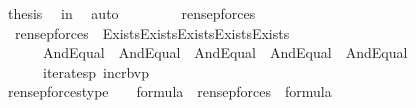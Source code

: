 \begin{isabellebody}
\ {\isacharquery}{\kern0pt}thesis\ \isamarkupfalse%
\ in{\isasymF}\ \isamarkupfalse%
\ auto\isanewline
\ \ \ \ \isamarkupfalse%
\isanewline
\ \ \isamarkupfalse%
\isanewline
{}\isamarkupfalse%
%
\endisatagproof
{\isafoldproof}%
%
\isadelimproof
\isanewline
%
\endisadelimproof
\isanewline
{}\isamarkupfalse%
\ ren{\isacharunderscore}{\kern0pt}sep{\isacharunderscore}{\kern0pt}forces\ \isanewline
\ \ {\isachardoublequoteopen}ren{\isacharunderscore}{\kern0pt}sep{\isacharunderscore}{\kern0pt}forces{\isacharparenleft}{\kern0pt}{\isasymphi}{\isacharparenright}{\kern0pt}\ {\isasymequiv}\ Exists{\isacharparenleft}{\kern0pt}Exists{\isacharparenleft}{\kern0pt}Exists{\isacharparenleft}{\kern0pt}Exists{\isacharparenleft}{\kern0pt}Exists{\isacharparenleft}{\kern0pt}\isanewline
\ \ \ \ \ \ And{\isacharparenleft}{\kern0pt}Equal{\isacharparenleft}{\kern0pt}{}{\isacharcomma}{\kern0pt}\ {}{\isacharparenright}{\kern0pt}{\isacharcomma}{\kern0pt}\ And{\isacharparenleft}{\kern0pt}Equal{\isacharparenleft}{\kern0pt}{}{\isacharcomma}{\kern0pt}\ {}{\isacharparenright}{\kern0pt}{\isacharcomma}{\kern0pt}\ And{\isacharparenleft}{\kern0pt}Equal{\isacharparenleft}{\kern0pt}{}{\isacharcomma}{\kern0pt}\ {}{\isacharparenright}{\kern0pt}{\isacharcomma}{\kern0pt}\ And{\isacharparenleft}{\kern0pt}Equal{\isacharparenleft}{\kern0pt}{}{\isacharcomma}{\kern0pt}\ {}{}{\isacharparenright}{\kern0pt}{\isacharcomma}{\kern0pt}\ And{\isacharparenleft}{\kern0pt}Equal{\isacharparenleft}{\kern0pt}{}{\isacharcomma}{\kern0pt}\ {}{}{\isacharparenright}{\kern0pt}{\isacharcomma}{\kern0pt}\ \isanewline
\ \ \ \ \ \ iterates{\isacharparenleft}{\kern0pt}{\isasymlambda}p{\isachardot}{\kern0pt}\ incr{\isacharunderscore}{\kern0pt}bv{\isacharparenleft}{\kern0pt}p{\isacharparenright}{\kern0pt}{\isacharbackquote}{\kern0pt}{}\ {\isacharcomma}{\kern0pt}\ {}{\isacharcomma}{\kern0pt}\ {\isasymphi}{\isacharparenright}{\kern0pt}{\isacharparenright}{\kern0pt}{\isacharparenright}{\kern0pt}{\isacharparenright}{\kern0pt}{\isacharparenright}{\kern0pt}{\isacharparenright}{\kern0pt}{\isacharparenright}{\kern0pt}{\isacharparenright}{\kern0pt}{\isacharparenright}{\kern0pt}{\isacharparenright}{\kern0pt}{\isacharparenright}{\kern0pt}{\isachardoublequoteclose}\ \isanewline
\isanewline
{}\isamarkupfalse%
\ ren{\isacharunderscore}{\kern0pt}sep{\isacharunderscore}{\kern0pt}forces{\isacharunderscore}{\kern0pt}type\ {\isacharcolon}{\kern0pt}\ {\isachardoublequoteopen}{\isasymphi}\ {\isasymin}\ formula\ {\isasymLongrightarrow}\ ren{\isacharunderscore}{\kern0pt}sep{\isacharunderscore}{\kern0pt}forces{\isacharparenleft}{\kern0pt}{\isasymphi}{\isacharparenright}{\kern0pt}\ {\isasymin}\ formula{\isachardoublequoteclose}\ \isanewline

\end{isabellebody}
